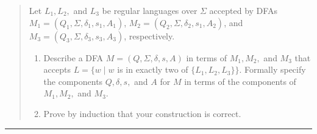 \documentclass[11pt]{article}
\begin{document}


\begin{quote}
Let $L_1, L_2,$ and $L_3$ be regular languages over $\Sigma$
  accepted by DFAs $M_1 = (Q_1, \Sigma, \delta_1, s_1, A_1)$,
  $M_2 = (Q_2, \Sigma, \delta_2, s_1, A_2)$, and $M_3 = (Q_3,
  \Sigma, \delta_3, s_3, A_3)$, respectively.

\begin{enumerate}
\item Describe a DFA $M = (Q, \Sigma, \delta, s, A)$ in terms of $M_1,
  M_2,$ and $M_3$ that accepts $L = \{w \mid w$ is in exactly two of
  $\{L_1, L_2, L_3\}\}.$ Formally specify the components $Q, \delta,
  s,$ and $A$ for $M$ in terms of the components of $M_1, M_2,$ and
  $M_3$.
\item Prove by induction that your construction is correct.
\end{enumerate}
\end{quote}
\hrule
\end{document}
